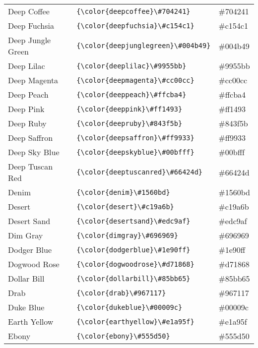 \documentclass[9.5pt]{article}
\begin{document}
\begin{longtable}{l | l | l}
	Deep Coffee & \verb!{\color{deepcoffee}\#704241}! & {\color{deepcoffee}\#704241}\\
	Deep Fuchsia & \verb!{\color{deepfuchsia}\#c154c1}! & {\color{deepfuchsia}\#c154c1}\\
	Deep Jungle Green & \verb!{\color{deepjunglegreen}\#004b49}! & {\color{deepjunglegreen}\#004b49}\\
	Deep Lilac & \verb!{\color{deeplilac}\#9955bb}! & {\color{deeplilac}\#9955bb}\\
	Deep Magenta & \verb!{\color{deepmagenta}\#cc00cc}! & {\color{deepmagenta}\#cc00cc}\\
	Deep Peach & \verb!{\color{deeppeach}\#ffcba4}! & {\color{deeppeach}\#ffcba4}\\
	Deep Pink & \verb!{\color{deeppink}\#ff1493}! & {\color{deeppink}\#ff1493}\\
	Deep Ruby & \verb!{\color{deepruby}\#843f5b}! & {\color{deepruby}\#843f5b}\\
	Deep Saffron & \verb!{\color{deepsaffron}\#ff9933}! & {\color{deepsaffron}\#ff9933}\\
	Deep Sky Blue & \verb!{\color{deepskyblue}\#00bfff}! & {\color{deepskyblue}\#00bfff}\\
	Deep Tuscan Red & \verb!{\color{deeptuscanred}\#66424d}! & {\color{deeptuscanred}\#66424d}\\
	Denim & \verb!{\color{denim}\#1560bd}! & {\color{denim}\#1560bd}\\
	Desert & \verb!{\color{desert}\#c19a6b}! & {\color{desert}\#c19a6b}\\
	Desert Sand & \verb!{\color{desertsand}\#edc9af}! & {\color{desertsand}\#edc9af}\\
	Dim Gray & \verb!{\color{dimgray}\#696969}! & {\color{dimgray}\#696969}\\
	Dodger Blue & \verb!{\color{dodgerblue}\#1e90ff}! & {\color{dodgerblue}\#1e90ff}\\
	Dogwood Rose & \verb!{\color{dogwoodrose}\#d71868}! & {\color{dogwoodrose}\#d71868}\\
	Dollar Bill & \verb!{\color{dollarbill}\#85bb65}! & {\color{dollarbill}\#85bb65}\\
	Drab & \verb!{\color{drab}\#967117}! & {\color{drab}\#967117}\\
	Duke Blue & \verb!{\color{dukeblue}\#00009c}! & {\color{dukeblue}\#00009c}\\
	Earth Yellow & \verb!{\color{earthyellow}\#e1a95f}! & {\color{earthyellow}\#e1a95f}\\
	Ebony & \verb!{\color{ebony}\#555d50}! & {\color{ebony}\#555d50}\\

\end{longtable}
\end{document}
